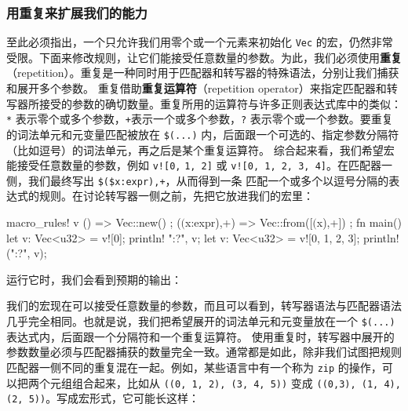 \subsubsection{用重复来扩展我们的能力}
\label{idx:idx_7c3ca546}
\label{idx:idx_0eb5d586}
至此必须指出，一个只允许我们用零个或一个元素来初始化 \texttt{Vec} 的宏，仍然非常受限。下面来修改规则，让它们能接受任意数量的参数。为此，我们必须使用\textbf{重复}（repetition）。重复是一种同时用于匹配器和转写器的特殊语法，分别让我们捕获和展开多个参数。
\label{idx:idx_b3729cef}
重复借助\textbf{重复运算符}（repetition operator）来指定匹配器和转写器所接受的参数的确切数量。重复所用的运算符与许多正则表达式库中的类似：\texttt{*} 表示零个或多个参数，\texttt{+}表示一个或多个参数，\texttt{?} 表示零个或一个参数。要重复的词法单元和元变量匹配被放在 \texttt{\$(...)} 内，后面跟一个可选的、指定参数分隔符（比如逗号）的词法单元，再之后是某个重复运算符。
综合起来看，我们希望宏能接受任意数量的参数，例如 \texttt{v![0,}
\texttt{1, 2]} 或 \texttt{v![\allowbreak{}0,\allowbreak{} 1,\allowbreak{} 2,\allowbreak{} 3,\allowbreak{} 4]\allowbreak{}}。在匹配器一侧，我们最终写出 \texttt{\$(\allowbreak{}\$x:expr)\allowbreak{},\allowbreak{}+}，从而得到一条
匹配一个或多个以逗号分隔的表达式的规则。在讨论转写器一侧之前，先把它放进我们的宏里：
\begin{codebox}[rust]
macro_rules! v {
  () => { Vec::new() };
  ($($x:expr),+) => { Vec::from([$($x),+]) };
}
fn main() {
  let v: Vec<u32> = v![0];
  println! {"{:?}", v};
  let v: Vec<u32> = v![0, 1, 2, 3];
  println!("{:?}", v);
}
\end{codebox}
运行它时，我们会看到预期的输出：
\begin{codeboxdark}
[0]
[0, 1, 2, 3]
\end{codeboxdark}
我们的宏现在可以接受任意数量的参数，而且可以看到，转写器语法与匹配器语法几乎完全相同。也就是说，我们把希望展开的词法单元和元变量放在一个 \texttt{\$(...)} 表达式内，后面跟一个分隔符和一个重复运算符。
\label{idx:idx_2f0af0d3}
使用重复时，转写器中展开的参数数量必须与匹配器捕获的数量完全一致。通常都是如此，除非我们试图把规则匹配器一侧不同的重复混在一起。例如，某些语言中有一个称为 \texttt{zip} 的操作，可以把两个元组组合起来，比如从 \texttt{(\allowbreak{}(\allowbreak{}0,\allowbreak{} 1,\allowbreak{} 2)\allowbreak{},\allowbreak{} (\allowbreak{}3,\allowbreak{} 4,\allowbreak{} 5)\allowbreak{})\allowbreak{}} 变成 \texttt{(\allowbreak{}(\allowbreak{}0,\allowbreak{}3)\allowbreak{},\allowbreak{} (\allowbreak{}1,\allowbreak{} 4)\allowbreak{},\allowbreak{} (\allowbreak{}2,\allowbreak{} 5)\allowbreak{})\allowbreak{}}。写成宏形式，它可能长这样：
